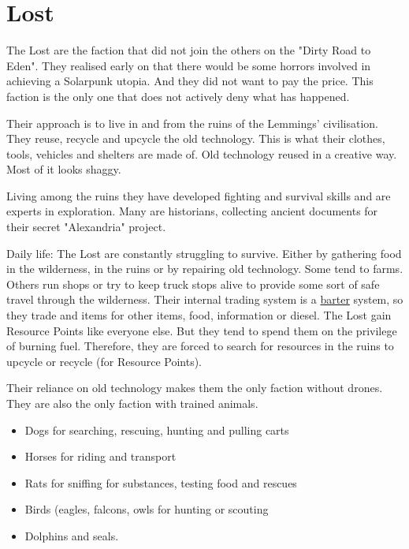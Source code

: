 \section{Lost}

The Lost are the faction that did not join the others on the "Dirty Road to Eden". They realised early on that there would be some horrors involved in achieving a Solarpunk utopia. And they did not want to pay the price. This faction is the only one that does not actively deny what has happened.

Their approach is to live in and from the ruins of the Lemmings' civilisation. They reuse, recycle and upcycle the old technology. This is what their clothes, tools, vehicles and shelters are made of. Old technology reused in a creative way. Most of it looks shaggy.

Living among the ruins they have developed fighting and survival skills and are experts in exploration.
Many are historians, collecting ancient documents for their secret "Alexandria" project.

Daily life: The Lost are constantly struggling to survive. Either by gathering food in the wilderness, in the ruins or by repairing old technology. Some tend to farms. Others run shops or try to keep truck stops alive to provide some sort of safe travel through the wilderness. Their internal trading system is a \hyperref[sec:Barter]{barter} system, so they trade and items for other items, food, information or diesel.
The Lost gain Resource Points like everyone else. But they tend to spend them on the privilege of burning fuel. Therefore, they are forced to search for resources in the ruins to upcycle or recycle (for Resource Points).

Their reliance on old technology makes them the only faction without drones. They are also the only faction with trained animals.

\begin{itemize}
    \item Dogs for searching, rescuing, hunting and pulling carts
    \item Horses for riding and transport
    \item Rats for sniffing for substances, testing food and rescues
    \item Birds (eagles, falcons, owls for hunting or scouting
    \item Dolphins and seals.
\end{itemize}

